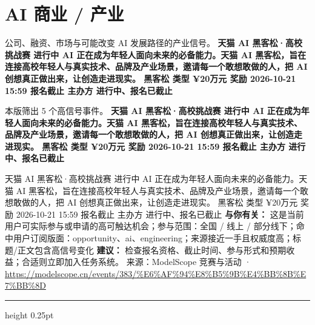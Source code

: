 \documentclass[10.5pt]{ctexart}
\begin{document}
\section*{AI 商业 / 产业}
{\color{ormuted} 公司、融资、市场与可能改变 AI 发展路径的产业信号。}
\vspace{2mm}
{\LARGE\bfseries 天猫 AI 黑客松·高校挑战赛 进行中 AI 正在成为年轻人面向未来的必备能力。天猫 AI 黑客松，旨在连接高校年轻人与真实技术、品牌及产业场景，邀请每一个敢想敢做的人，把 AI 创想真正做出来，让创造走进现实。 黑客松 类型 ¥20万元 奖励 2026-10-21 15:59 报名截止 主办方 进行中、报名已截止}\par
\vspace{1mm}
{\color{ormuted} 本版筛出 5 个高信号事件。}
\vspace{3mm}
{\Large\bfseries 天猫 AI 黑客松·高校挑战赛 进行中 AI 正在成为年轻人面向未来的必备能力。天猫 AI 黑客松，旨在连接高校年轻人与真实技术、品牌及产业场景，邀请每一个敢想敢做的人，把 AI 创想真正做出来，让创造走进现实。 黑客松 类型 ¥20万元 奖励 2026-10-21 15:59 报名截止 主办方 进行中、报名已截止}\par
天猫 AI 黑客松·高校挑战赛 进行中 AI 正在成为年轻人面向未来的必备能力。天猫 AI 黑客松，旨在连接高校年轻人与真实技术、品牌及产业场景，邀请每一个敢想敢做的人，把 AI 创想真正做出来，让创造走进现实。 黑客松 类型 ¥20万元 奖励 2026-10-21 15:59 报名截止 主办方 进行中、报名已截止
\textbf{与你有关：} 这是当前用户可实际参与或申请的高可触达机会；参与范围：全国 / 线上 / 部分线下；命中用户订阅版面：opportunity、ai、engineering；来源接近一手且权威度高；标题/正文包含高信号变化
\textbf{建议：} 检查报名资格、截止时间、参与形式和预期收益；合适则立即加入任务系统。
{\footnotesize\color{ormuted} 来源：ModelScope 竞赛与活动 · \url{https://modelscope.cn/events/383/%E6%AF%94%E8%B5%9B%E4%BB%8B%E7%BB%8D}}
\vspace{4mm}
\hrule height 0.25pt
\vspace{3mm}
\end{document}
